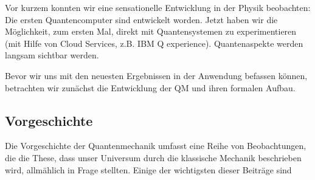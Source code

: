 Vor kurzem konnten wir eine sensationelle Entwicklung in der Physik beobachten: Die ersten Quantencomputer sind entwickelt worden. Jetzt haben wir die Möglichkeit, zum ersten Mal, direkt mit Quantensystemen zu experimentieren (mit Hilfe von Cloud Services, z.B. IBM Q experience). Quantenaspekte werden langsam sichtbar werden. 

Bevor wir uns mit den neuesten Ergebnissen in der Anwendung befassen können, betrachten wir zunächst die Entwicklung der QM und ihren formalen Aufbau. 

\subsection{Vorgeschichte}
Die Vorgeschichte der Quantenmechanik umfasst eine Reihe von Beobachtungen, die die These, dass unser Universum durch die klassische Mechanik beschrieben wird, allmählich in Frage stellten. Einige der wichtigsten dieser Beiträge sind
